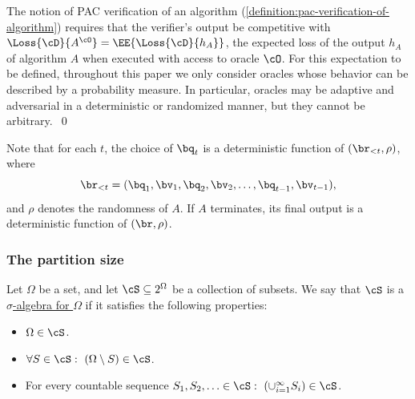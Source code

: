 \documentclass{toc}
\begin{document}
\begin{remark}
	The notion of PAC verification of an algorithm (\cref{definition:pac-verification-of-algorithm}) requires that the verifier's output be competitive with $\Loss{\cD}{A^\cO} = \EE{\Loss{\cD}{h_A}}$, the expected loss of the output $h_A$ of algorithm $A$ when executed with access to oracle $\cO$. For this expectation to be defined, throughout this paper we only consider oracles whose behavior can be described by a probability measure. In particular, oracles may be adaptive and adversarial in a deterministic or randomized manner, but they cannot be arbitrary.~\qed
\end{remark}


Note that for each $t$, the choice of $\bq_t$ is a deterministic function of $(\br_{< t},\rho)$, where 
\[
	\br_{< t} = (\bq_1,\bv_1,\bq_2,\bv_2,\dots,\bq_{t-1},\bv_{t-1}),
\]
and $\rho$ denotes the randomness of $A$. If $A$ terminates, its final output is a deterministic function of $(\br,\rho)$.

\subsubsection{The partition size}

\begin{definition}
	Let $\Omega$ be a set, and let $\cS \subseteq 2^\Omega$ be a collection of subsets. We say that $\cS$ is a \ul{$\sigma$-algebra for $\Omega$} if it satisfies the following properties:
	\begin{itemize}
		\item{$\Omega \in \cS$.}
		\item{$\forall S \in \cS: ~ (\Omega \setminus S) \in \cS$.}
		\item{For every countable sequence $S_1,S_2,\ldots \in \cS: ~ \left(\cup_{i=1}^\infty S_i\right) \in \cS$.}
	\end{itemize}
\end{definition}
\end{document}
